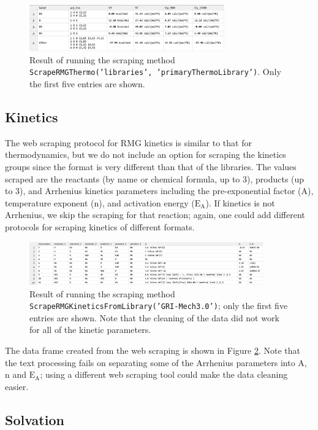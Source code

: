 \documentclass[11pt]{article}
\begin{document}
\begin{figure}[h]
\centering
\includegraphics[width=0.75\textwidth]{thermo_df.pdf}
\caption{\label{fig:thermo_df} Result of running the scraping method \texttt{ScrapeRMGThermo('libraries', 'primaryThermoLibrary')}. Only the first five entries are shown.}
\end{figure}

\subsection{Kinetics}

The web scraping protocol for RMG kinetics is similar to that for thermodynamics, but we do not include an option for scraping the kinetics groups since the format is very different than that of the libraries. The values scraped are the reactants (by name or chemical formula, up to 3), products (up to 3), and Arrhenius kinetics parameters including the pre-exponential factor (A), temperature exponent (n), and activation energy ($\mathrm{E_A}$). If kinetics is not Arrhenius, we skip the scraping for that reaction; again, one could add different protocols for scraping kinetics of different formats.

\begin{figure}[h]
\centering
\includegraphics[width=0.9\textwidth]{kinetics_df.pdf}
\caption{\label{fig:kinetics_df} Result of running the scraping method \texttt{ScrapeRMGKineticsFromLibrary('GRI-Mech3.0')}; only the first five entries are shown. Note that the cleaning of the data did not work for all of the kinetic parameters.}
\end{figure}

The data frame created from the web scraping is shown in Figure \ref{fig:kinetics_df}. Note that the text processing fails on separating some of the Arrhenius parameters into A, n and $\mathrm{E_A}$; using a different web scraping tool could make the data cleaning easier.

\subsection{Solvation}
\end{document}
